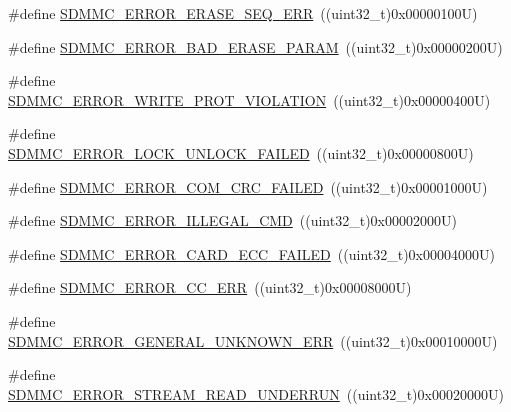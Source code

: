 \begin{DoxyCompactItemize}
\item 
\#define \mbox{\hyperlink{group___s_d_m_m_c___l_l___exported___constants_ga23fee50a8501571d2d72e761dd6f42c5}{S\+D\+M\+M\+C\+\_\+\+E\+R\+R\+O\+R\+\_\+\+E\+R\+A\+S\+E\+\_\+\+S\+E\+Q\+\_\+\+E\+RR}}~((uint32\+\_\+t)0x00000100\+U)
\item 
\#define \mbox{\hyperlink{group___s_d_m_m_c___l_l___exported___constants_ga90484f34f4b2a9c9fcaffb37a2185e3d}{S\+D\+M\+M\+C\+\_\+\+E\+R\+R\+O\+R\+\_\+\+B\+A\+D\+\_\+\+E\+R\+A\+S\+E\+\_\+\+P\+A\+R\+AM}}~((uint32\+\_\+t)0x00000200\+U)
\item 
\#define \mbox{\hyperlink{group___s_d_m_m_c___l_l___exported___constants_gaf465a4ac14ab2c5509170f9a9948b03f}{S\+D\+M\+M\+C\+\_\+\+E\+R\+R\+O\+R\+\_\+\+W\+R\+I\+T\+E\+\_\+\+P\+R\+O\+T\+\_\+\+V\+I\+O\+L\+A\+T\+I\+ON}}~((uint32\+\_\+t)0x00000400\+U)
\item 
\#define \mbox{\hyperlink{group___s_d_m_m_c___l_l___exported___constants_ga36771b073b4605e40d2bb00354df6bc0}{S\+D\+M\+M\+C\+\_\+\+E\+R\+R\+O\+R\+\_\+\+L\+O\+C\+K\+\_\+\+U\+N\+L\+O\+C\+K\+\_\+\+F\+A\+I\+L\+ED}}~((uint32\+\_\+t)0x00000800\+U)
\item 
\#define \mbox{\hyperlink{group___s_d_m_m_c___l_l___exported___constants_ga186a3ff3b5bd47d478ddbc58877c8115}{S\+D\+M\+M\+C\+\_\+\+E\+R\+R\+O\+R\+\_\+\+C\+O\+M\+\_\+\+C\+R\+C\+\_\+\+F\+A\+I\+L\+ED}}~((uint32\+\_\+t)0x00001000\+U)
\item 
\#define \mbox{\hyperlink{group___s_d_m_m_c___l_l___exported___constants_gad28ae2b183432ff4307f6ef736b9ac4e}{S\+D\+M\+M\+C\+\_\+\+E\+R\+R\+O\+R\+\_\+\+I\+L\+L\+E\+G\+A\+L\+\_\+\+C\+MD}}~((uint32\+\_\+t)0x00002000\+U)
\item 
\#define \mbox{\hyperlink{group___s_d_m_m_c___l_l___exported___constants_gacefedcad3eb04c2edc0ef2ddbee00e42}{S\+D\+M\+M\+C\+\_\+\+E\+R\+R\+O\+R\+\_\+\+C\+A\+R\+D\+\_\+\+E\+C\+C\+\_\+\+F\+A\+I\+L\+ED}}~((uint32\+\_\+t)0x00004000\+U)
\item 
\#define \mbox{\hyperlink{group___s_d_m_m_c___l_l___exported___constants_ga5cbd52e71a9857f01b210e5048da5f44}{S\+D\+M\+M\+C\+\_\+\+E\+R\+R\+O\+R\+\_\+\+C\+C\+\_\+\+E\+RR}}~((uint32\+\_\+t)0x00008000\+U)
\item 
\#define \mbox{\hyperlink{group___s_d_m_m_c___l_l___exported___constants_ga3079b242ec737a24726bc038aaff971f}{S\+D\+M\+M\+C\+\_\+\+E\+R\+R\+O\+R\+\_\+\+G\+E\+N\+E\+R\+A\+L\+\_\+\+U\+N\+K\+N\+O\+W\+N\+\_\+\+E\+RR}}~((uint32\+\_\+t)0x00010000\+U)
\item 
\#define \mbox{\hyperlink{group___s_d_m_m_c___l_l___exported___constants_ga3c0046058cfbc268556f10866b34966f}{S\+D\+M\+M\+C\+\_\+\+E\+R\+R\+O\+R\+\_\+\+S\+T\+R\+E\+A\+M\+\_\+\+R\+E\+A\+D\+\_\+\+U\+N\+D\+E\+R\+R\+UN}}~((uint32\+\_\+t)0x00020000\+U)

\end{DoxyCompactItemize}
